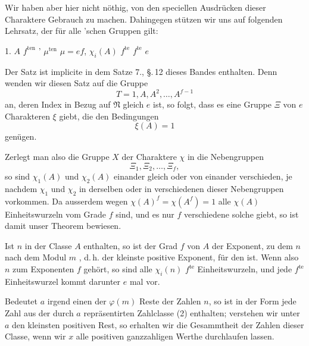 
Wir haben aber hier nicht nöthig, von den speciellen Ausdrücken dieser
Charaktere Gebrauch zu machen. Dahingegen stützen wir uns auf folgenden
Lehrsatz, der für alle 'schen Gruppen gilt:

1.  $A$  $f^{\text{ten}}$  ' $\mu^{\text{ten}}$
 $\mu = ef$,  $\chi_i(A)$
$f^{\text{te}}$ 
$f^{\text{te}}$  $e$ 

Der Satz ist implicite in dem Satze 7., \S.\,12 dieses Bandes enthalten. Denn
wenden wir diesen Satz auf die Gruppe
\[
T = 1, A, A^2, \ldots, A^{f-1}
\]
an, deren Index in Bezug auf $\mathfrak{N}$ gleich $e$ ist, so folgt, dass es
eine Gruppe $\Xi$ von $e$ Charakteren $\xi$ giebt, die den
Bedingungen
\[
\xi(A) = 1
\]
genügen.

Zerlegt man also die Gruppe $X$ der Charaktere $\chi$ in die Nebengruppen
\[
\Xi_1, \Xi_2, \ldots, \Xi_f,
\]
so sind $\chi_1(A)$ und $\chi_2(A)$ einander gleich oder von einander
verschieden, je nachdem $\chi_1$ und $\chi_2$ in derselben oder in
verschiedenen dieser Nebengruppen vorkommen. Da ausserdem wegen
$\chi(A)^f = \chi(A^f) = 1$ alle $\chi(A)$ Einheitswurzeln vom Grade $f$
sind, und es nur $f$ verschiedene solche giebt, so ist damit unser Theorem
bewiesen.

Ist $n$ in der Classe $A$ enthalten, so ist der Grad $f$ von $A$ der
Exponent, zu dem $n$ nach dem Modul $m$ , d.\,h. der kleinste positive
Exponent, für den
ist. Wenn also $n$ zum Exponenten $f$ gehört, so sind alle $\chi_i(n)$
$f^{\text{te}}$ Einheitswurzeln, und jede $f^{\text{te}}$ Einheitswurzel
kommt darunter $e$ mal vor.

Bedeutet $a$ irgend einen der $\varphi(m)$ Reste der Zahlen $n$, so ist in der
Form
jede Zahl aus der durch $a$ repräsentirten Zahlclasse (2) enthalten;
verstehen wir unter $a$ den kleinsten positiven Rest, so erhalten wir die
Gesammtheit der Zahlen dieser Classe, wenn wir $x$ alle positiven
ganzzahligen Werthe durchlaufen lassen.

